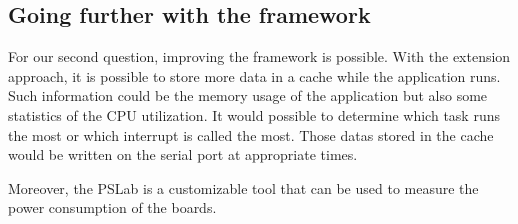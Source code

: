 \subsection*{Going further with the framework}

For our second question, improving the framework is possible.
With the extension approach, it is possible to store more data in a cache while the application runs.
Such information could be the memory usage of the application but also some statistics of the CPU utilization.
It would possible to determine which task runs the most or which interrupt is called the most.
Those datas stored in the cache would be written on the serial port at appropriate times.

Moreover, the PSLab is a customizable tool that can be used to measure the power consumption of the boards.